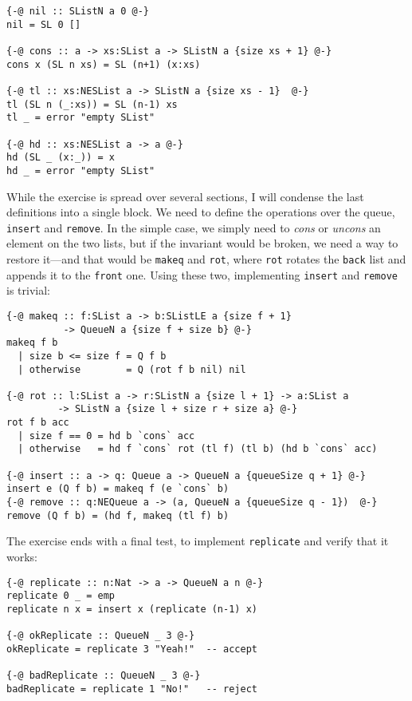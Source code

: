 \documentclass[11pt]{article}
\begin{document}
\begin{verbatim}
{-@ nil :: SListN a 0 @-}
nil = SL 0 []

{-@ cons :: a -> xs:SList a -> SListN a {size xs + 1} @-}
cons x (SL n xs) = SL (n+1) (x:xs)

{-@ tl :: xs:NESList a -> SListN a {size xs - 1}  @-}
tl (SL n (_:xs)) = SL (n-1) xs
tl _ = error "empty SList"

{-@ hd :: xs:NESList a -> a @-}
hd (SL _ (x:_)) = x
hd _ = error "empty SList"
\end{verbatim}

While the exercise is spread over several sections, I will condense the last
definitions into a single block. We need to define the operations over the
queue, \texttt{insert} and \texttt{remove}. In the simple case, we simply need to \emph{cons} or \emph{uncons}
an element on the two lists, but if the invariant would be broken, we need a way
to restore it---and that would be \texttt{makeq} and \texttt{rot}, where \texttt{rot} rotates the \texttt{back} list
and appends it to the \texttt{front} one. Using these two, implementing \texttt{insert} and \texttt{remove}
is trivial:

\begin{verbatim}
{-@ makeq :: f:SList a -> b:SListLE a {size f + 1}
          -> QueueN a {size f + size b} @-}
makeq f b
  | size b <= size f = Q f b
  | otherwise        = Q (rot f b nil) nil

{-@ rot :: l:SList a -> r:SListN a {size l + 1} -> a:SList a
         -> SListN a {size l + size r + size a} @-}
rot f b acc
  | size f == 0 = hd b `cons` acc
  | otherwise   = hd f `cons` rot (tl f) (tl b) (hd b `cons` acc)

{-@ insert :: a -> q: Queue a -> QueueN a {queueSize q + 1} @-}
insert e (Q f b) = makeq f (e `cons` b)
{-@ remove :: q:NEQueue a -> (a, QueueN a {queueSize q - 1})  @-}
remove (Q f b) = (hd f, makeq (tl f) b)
\end{verbatim}

The exercise ends with a final test, to implement \texttt{replicate} and verify that it
works:

\begin{verbatim}
{-@ replicate :: n:Nat -> a -> QueueN a n @-}
replicate 0 _ = emp
replicate n x = insert x (replicate (n-1) x)

{-@ okReplicate :: QueueN _ 3 @-}
okReplicate = replicate 3 "Yeah!"  -- accept

{-@ badReplicate :: QueueN _ 3 @-}
badReplicate = replicate 1 "No!"   -- reject
\end{verbatim}
\end{document}
